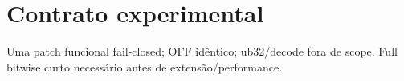 \section{Contrato experimental}
Uma patch funcional fail-closed; OFF idêntico; ub32/decode fora de scope. Full bitwise curto necessário antes de extensão/performance.
